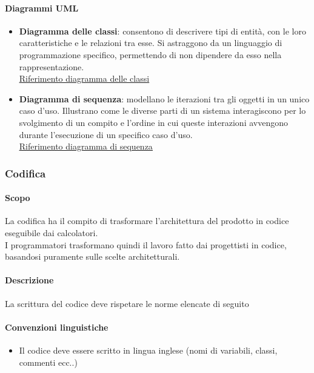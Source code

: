 \documentclass[a4paper, 12pt]{article}
\begin{document}
\paragraph{Diagrammi UML}
\begin{itemize}
	\item \textbf{Diagramma delle classi}: consentono di descrivere tipi di entità, con le loro caratteristiche e le 
	relazioni tra esse. Si astraggono da un linguaggio di programmazione specifico, permettendo di non 
	dipendere da esso nella rappresentazione.\\
	\href{https://www.math.unipd.it/~rcardin/swea/2021/Diagrammi%20delle%20Classi_4x4.pdf}{\underline{Riferimento diagramma delle classi}}
	\item \textbf{Diagramma di sequenza}: modellano le iterazioni tra gli oggetti in un unico caso d'uso. Illustrano come 
	le diverse parti di un sistema interagiscono per lo svolgimento di un compito e l'ordine in cui queste interazioni
	avvengono durante l'esecuzione di un specifico caso d'uso.\\
	\href{https://www.math.unipd.it/~rcardin/swea/2022/Diagrammi%20di%20Sequenza.pdf}{\underline{Riferimento diagramma di sequenza}}

\end{itemize}
	

\subsubsection{Codifica}
\paragraph{Scopo}
La codifica ha il compito di trasformare l'architettura del prodotto in codice eseguibile dai calcolatori.\\
I programmatori trasformano quindi il lavoro fatto dai progettisti in codice, basandosi puramente sulle scelte architetturali.
\paragraph{Descrizione}
La scrittura del codice deve rispetare le norme elencate di seguito
\paragraph{Convenzioni linguistiche}
\begin{itemize}
	\item Il codice deve essere scritto in lingua inglese (nomi di variabili, classi, commenti ecc..)
\end{itemize}
\end{document}
